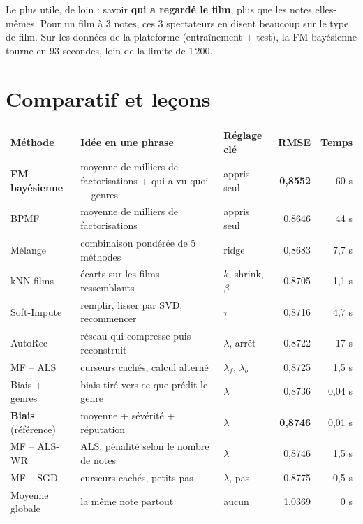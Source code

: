 \documentclass[11pt,a4paper]{article}
\begin{document}
Le plus utile, de loin : savoir \textbf{qui a regardé le film}, plus que les notes
elles-mêmes. Pour un film à 3 notes, ces 3 spectateurs en disent beaucoup sur le type de
film. Sur les données de la plateforme (entraînement + test), la FM bayésienne tourne en
93 secondes, loin de la limite de 1\,200.

\section{Comparatif et leçons}

\begin{center}
\small
\begin{tabularx}{\linewidth}{@{}lXlrr@{}}
\toprule
\textbf{Méthode} & \textbf{Idée en une phrase} & \textbf{Réglage clé} & \textbf{RMSE} & \textbf{Temps} \\
\midrule
\textbf{FM bayésienne} & moyenne de milliers de factorisations + qui a vu quoi + genres & appris seul & \textbf{0,8552} & 60 s \\
BPMF & moyenne de milliers de factorisations & appris seul & 0,8646 & 44 s \\
Mélange & combinaison pondérée de 5 méthodes & ridge & 0,8683 & 7,7 s \\
kNN films & écarts sur les films ressemblants & $k$, shrink, $\beta$ & 0,8705 & 1,1 s \\
Soft-Impute & remplir, lisser par SVD, recommencer & $\tau$ & 0,8716 & 4,7 s \\
AutoRec & réseau qui compresse puis reconstruit & $\lambda$, arrêt & 0,8722 & 17 s \\
MF -- ALS & curseurs cachés, calcul alterné & $\lambda_f$, $\lambda_b$ & 0,8725 & 1,5 s \\
Biais + genres & biais tiré vers ce que prédit le genre & $\lambda$ & 0,8736 & 0,04 s \\
\textbf{Biais} (référence) & moyenne + sévérité + réputation & $\lambda$ & \textbf{0,8746} & 0,01 s \\
MF -- ALS-WR & ALS, pénalité selon le nombre de notes & $\lambda$ & 0,8746 & 1,5 s \\
MF -- SGD & curseurs cachés, petits pas & $\lambda$, pas & 0,8775 & 0,5 s \\
Moyenne globale & la même note partout & aucun & 1,0369 & 0 s \\
\bottomrule
\end{tabularx}
\end{center}
\end{document}
